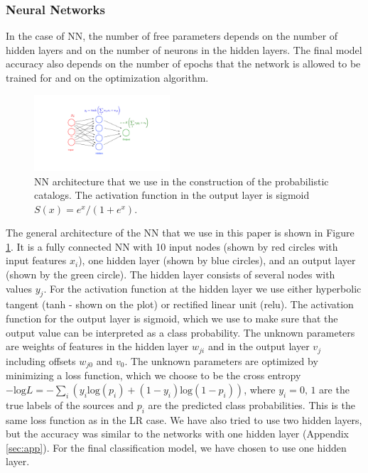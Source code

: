 \subsubsection{Neural Networks}

In the case of NN, the number of free parameters depends on the number of hidden layers and on the number of neurons in the hidden layers. The final model accuracy also depends on the number of epochs that the network is allowed to be trained for and on the optimization algorithm. 

\begin{figure}[h]
\centering
\hspace*{-0.5cm}
\includegraphics[width=0.45\textwidth]{plots/CNN_network.pdf}
\caption{
NN architecture that we use in the construction of the probabilistic catalogs.
The activation function in the output layer is sigmoid $S(x) = {e^{x}}/{(1 + e^{x})}$.
}
\label{fig:NN_structure}
\end{figure}

The general architecture of the NN that we use in this paper is shown in Figure \ref{fig:NN_structure}.
It is a fully connected NN with 10 input nodes (shown by red circles with input features $x_i$), one hidden layer (shown by blue circles),
and an output layer (shown by the green circle).
The hidden layer consists of several nodes with values $y_j$. 
For the activation function at the hidden layer we use either hyperbolic tangent (tanh - shown on the plot) or rectified linear unit (relu).
The activation function for the output layer is sigmoid, which we use to make sure that the output value can be interpreted as a class probability.
The unknown parameters are weights of features in the hidden layer $w_{ji}$ and in the output layer $v_j$ including
offsets $w_{j0}$ and $v_0$.
The unknown parameters are optimized by minimizing a loss function, which we choose to be
the cross entropy
$-\text{log}L = - \sum_i (y_i\text{log}(p_i)+(1-y_i)\text{log}(1 - p_i))$, 
where $y_i = 0,\,1$ are the true labels of the sources and $p_i$ are the predicted class probabilities.
This is the same loss function as in the LR case.
We have also tried to use two hidden layers, but the accuracy was similar to the networks with one hidden layer (Appendix \ref{sec:app}). For the final classification model, we have chosen to use one hidden layer.

